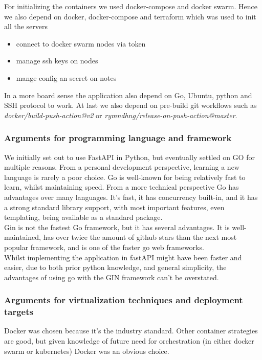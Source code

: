 For initializing the containers we used docker-compose and docker swarm. Hence we also depend on docker, docker-compose
and terraform which was used to init all the servers
\begin{itemize}
    \item connect to docker swarm nodes via token
    \item manage ssh keys on nodes 
    \item mange config an secret on notes
\end{itemize}

In a more board sense the application also depend on Go, Ubuntu, python and SSH protocol to work. At last we 
also depend on pre-build git workflows such as \textit{docker/build-push-action@v2} or \textit{rymndhng/release-on-push-action@master}.

\subsubsection{Arguments for programming language and framework}
We initially set out to use FastAPI in Python, but eventually settled on GO for multiple reasons. From a personal 
development perspective, learning a new language is rarely a poor choice. Go is well-known for being relatively 
fast to learn, whilst maintaining speed. From a more technical perspective Go has advantages over many languages. 
It's fast, it has concurrency built-in, and it has a strong standard library support, with most important features, 
even templating, being available as a standard package.\\

Gin is not the fastest Go framework, but it has several advantages. It is well-maintained, has over twice the 
amount of github stars than the next most popular framework, and is one of the faster go web frameworks.\\

Whilst implementing the application in fastAPI might have been faster and easier, due to both prior python 
knowledge, and general simplicity, the advantages of using go with the GIN framework can't be overstated. 

\subsubsection{Arguments for virtualization techniques and deployment targets}
Docker was chosen because it's the industry standard. Other container strategies are good, but given knowledge 
of future need for orchestration (in either docker swarm or kubernetes) Docker was an obvious choice.\\

